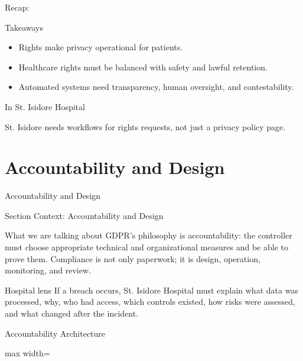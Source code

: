 \documentclass[presentation]{beamer}
\newcommand{\sectiontitleframe}[1]{
\begin{frame}[plain,c]
\begin{center}
{\usebeamerfont{title}\usebeamercolor[fg]{title}#1}
\end{center}
\end{frame}
}
\newcommand{\scenario}{St. Isidore Hospital}
\newcommand{\takeawaysframe}[2]{
\begin{frame}[c]{Recap: \insertsection}
\begin{block}{Takeaways}
#1
\end{block}
\begin{exampleblock}{In \scenario}
#2
\end{exampleblock}
\end{frame}
}
\begin{document}
\takeawaysframe{
\begin{itemize}
    \item Rights make privacy operational for patients.
    \item Healthcare rights must be balanced with safety and lawful retention.
    \item Automated systems need transparency, human oversight, and contestability.
\end{itemize}
}{
St. Isidore needs workflows for rights requests, not just a privacy policy page.
}

\section{Accountability and Design}
\sectiontitleframe{Accountability and Design}

\begin{frame}[c]{Section Context: Accountability and Design}
\begin{block}{What we are talking about}
GDPR's philosophy is accountability: the controller must choose appropriate technical and
organizational measures and be able to prove them. Compliance is not only paperwork; it is design,
operation, monitoring, and review.
\end{block}

\begin{exampleblock}{Hospital lens}
If a breach occurs, \scenario{} must explain what data was processed, why, who had access, which
controls existed, how risks were assessed, and what changed after the incident.
\end{exampleblock}
\end{frame}

\begin{frame}[c]{Accountability Architecture}
\begin{center}
\begin{adjustbox}{max width=\textwidth}
\end{adjustbox}
\end{center}
\end{frame}
\end{document}
